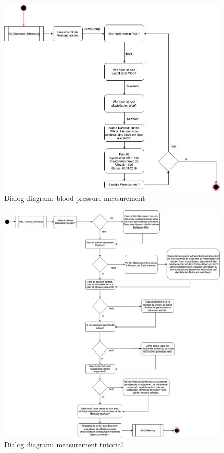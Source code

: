 \begin{figure}[h]
	\centering
	\includegraphics[width=1\textwidth]{images/03_blutdruck_messung.png}
	\caption{Dialog diagram: blood pressure measurement}
	\label{dialog_diagram_03}
\end{figure}

\begin{figure}[h]
	\centering
	\includegraphics[width=1\textwidth]{images/06_tutorial_messung.png}
	\caption{Dialog diagram: measurement tutorial}
	\label{dialog_diagram_04}
\end{figure}

